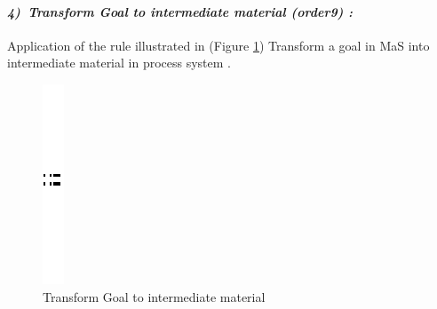 \paragraph{\emph{4)~Transform Goal to intermediate material (order9) :} }
Application of the rule illustrated in (Figure \ref{fig:Transform Goal to intermediate material}) Transform a goal in MaS into intermediate material in process system .
 
\begin{figure}[th]
\centering 
	\quad{}
		\includegraphics{Chapiter3/img/sep}
	\quad{}
\caption{\label{fig:Transform Goal to intermediate material}Transform Goal to intermediate material}
 
\end{figure}
 
